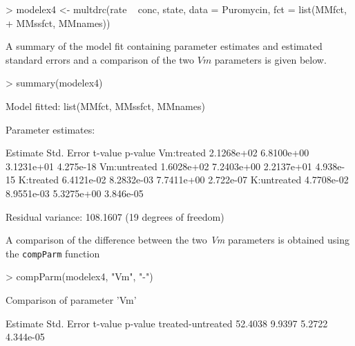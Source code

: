 \documentclass[a4paper]{article}
\begin{document}
\begin{Schunk}
\begin{Sinput}
> modelex4 <- multdrc(rate ~ conc, state, data = Puromycin, fct = list(MMfct, 
+     MMssfct, MMnames))
\end{Sinput}
\end{Schunk}
A summary of the model fit containing parameter estimates and estimated standard errors and a comparison of the two $Vm$ parameters is given below.

\begin{Schunk}
\begin{Sinput}
> summary(modelex4)
\end{Sinput}
\begin{Soutput}
Model fitted: list(MMfct, MMssfct, MMnames)

Parameter estimates:

               Estimate Std. Error    t-value   p-value
Vm:treated   2.1268e+02 6.8100e+00 3.1231e+01 4.275e-18
Vm:untreated 1.6028e+02 7.2403e+00 2.2137e+01 4.938e-15
K:treated    6.4121e-02 8.2832e-03 7.7411e+00 2.722e-07
K:untreated  4.7708e-02 8.9551e-03 5.3275e+00 3.846e-05

Residual variance: 108.1607 (19 degrees of freedom)
\end{Soutput}
\end{Schunk}
A comparison of the difference between the two \emph{Vm} parameters is obtained using the \verb+compParm+ function
\begin{Schunk}
\begin{Sinput}
> compParm(modelex4, "Vm", "-")
\end{Sinput}
\begin{Soutput}
Comparison of parameter 'Vm' 

                  Estimate Std. Error t-value   p-value
treated-untreated  52.4038     9.9397  5.2722 4.344e-05
\end{Soutput}
\end{Schunk}



\end{document}
